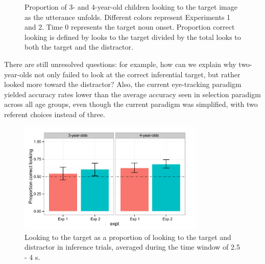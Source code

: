 \documentclass[10pt,letterpaper]{article}
\begin{document}
\begin{figure}[t]
	\caption{\label{fig:pros0} Proportion of 3- and 4-year-old children looking to the target image as the utterance unfolds. Different colors represent Experiments 1 and 2. Time 0 represents the target noun onset. Proportion correct looking is defined by looks to the target divided by the total looks to both the target and the distractor.}
\end{figure}


There are still unresolved questions: for example, how can we explain why two-year-olds not only failed to look at the correct inferential target, but rather looked more toward the distractor? Also, the current eye-tracking paradigm yielded accuracy rates lower than the average accuracy seen in selection paradigm  across all age groups, even though the current paradigm was simplified, with two referent choices instead of three. 

\begin{figure}
\begin{center} 
\includegraphics[width=3.5in]{figures/simpimp0pros-bar_inf.pdf}
\caption{\label{fig:0prosbar} Looking to the target as a proportion of looking to the target and distractor in inference trials, averaged during the time window of 2.5 - 4 s.}
\end{center} 
\end{figure}
\end{document}
